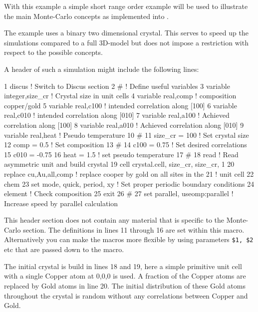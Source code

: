 With this example a simple short range order example will be used to 
illustrate the main Monte-Carlo concepts as implemented into \discus.

The example uses a binary two dimensional crystal. This serves to speed up 
the simulations compared to a full 3D-model but does not impose a restriction
with respect to the possible concepts.

A header of such a simulation might include the following lines:

\begin{MacVerbatim}
  1  discus                     ! Switch to Discus section
  2  #                          ! Define useful variables
  3  variable integer,size_cr   ! Crystal size in unit cells
  4  variable real,comp         ! composition copper/gold
  5  variable real,c100         ! intended correlation along [100]
  6  variable real,c010         ! intended correlation along [010]
  7  variable real,a100         ! Achieved correlation along [100]
  8  variable real,a010         ! Achieved correlation along [010]
  9  variable real,heat         ! Pseudo temperature
 10  #
 11  size_cr = 100              ! Set crystal size
 12  comp = 0.5                 ! Set composition
 13  #
 14  c100 =  0.75               ! Set desired correlations
 15  c010 = -0.75
 16  heat =  1.5                ! set pseudo temperature
 17  #
 18  read                       ! Read asymmetric unit and build crystal
 19    cell crystal.cell, size_cr, size_cr, 1
 20  replace cu,Au,all,comp     ! replace cooper by gold on all sites in the 
 21                             !   unit cell
 22  chem
 23    set mode, quick, period, xy   ! Set proper periodic boundary conditions
 24    element                       ! Check composition
 25  exit
 26  #
 27  set parallel, useomp:parallel   ! Increase speed by parallel calculation
\end{MacVerbatim}

This header section does not contain any material that is specific to the 
Monte-Carlo section. The definitions in lines 11 through 16 are set within this
macro. Alternatively you can make the macros more flexible by using parameters
{\tt \$1, \$2} etc that are passed down to the macro.

The initial crystal is build in lines 18 and 19, here a simple primitive unit 
cell with a single Copper atom at 0,0,0 is used. A fraction of the Copper atoms
are replaced by Gold atoms in line 20. The initial distribution of these Gold
atoms throughout the crystal is random without any correlations between Copper and Gold.

